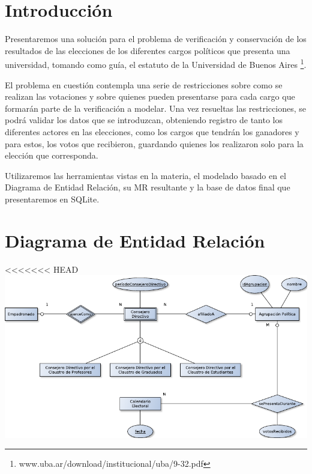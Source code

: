 \documentclass[a4paper, 10pt, twoside]{article}
\begin{document}
\newpage




\section{Introducción}

Presentaremos una solución para el problema de verificación y conservación de los resultados de las elecciones de los diferentes cargos políticos que presenta una universidad, tomando como guía, el estatuto de la Universidad de Buenos Aires \footnote{www.uba.ar/download/institucional/uba/9-32.pdf}.

El problema en cuestión contempla una serie de restricciones sobre como se realizan las votaciones y sobre quienes pueden presentarse para cada cargo que formarán parte de la verificación a modelar. Una vez resueltas las restricciones, se podrá validar los datos que se introduzcan, obteniendo registro de tanto los diferentes actores en las elecciones, como los cargos que tendrán los ganadores y para estos, los votos que recibieron, guardando quienes los realizaron solo para la elección que corresponda.

Utilizaremos las herramientas vistas en la materia, el modelado basado en el Diagrama de Entidad Relación, su MR resultante y la base de datos final que presentaremos en SQLite.


\newpage




\section{Diagrama de Entidad Relación}

<<<<<<< HEAD
\includegraphics{../diagramas/eleccionesCD.pdf}
\end{document}
